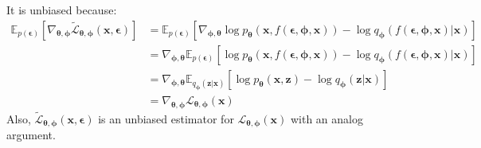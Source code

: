 \documentclass[12pt]{report}
\theoremstyle{definition}
\begin{document}
It is unbiased because:
\begin{equation}
\begin{split}
\mathbb{E}_{p(\pmb{\epsilon})}\left[ \nabla_{\pmb{\theta}, \pmb{\phi}}\tilde{\mathcal{L}}_{\pmb{\theta}, \pmb{\phi}}(\mathbf{x}, \pmb{\epsilon}) \right] 
& = \mathbb{E}_{p(\pmb{\epsilon})}\left[ \nabla_{\pmb{\phi}, \pmb{\theta}} \log p_{\mathbf{\theta}}(\mathbf{x}, f(\pmb{\epsilon}, \pmb{\phi}, \mathbf{x})) - \log q_{\mathbf{\phi}}(f(\pmb{\epsilon}, \pmb{\phi}, \mathbf{x})|\mathbf{x}) \right] \\
& = \nabla_{\pmb{\phi}, \pmb{\theta}} \mathbb{E}_{p(\pmb{\epsilon})}\left[  \log p_{\mathbf{\theta}}(\mathbf{x}, f(\pmb{\epsilon}, \pmb{\phi}, \mathbf{x})) - \log q_{\mathbf{\phi}}(f(\pmb{\epsilon}, \pmb{\phi}, \mathbf{x})|\mathbf{x}) \right] \\
& = \nabla_{\pmb{\phi}, \pmb{\theta}} \mathbb{E}_{q_{\mathbf{\phi}}(\mathbf{z}|\mathbf{x})}\left[  \log p_{\mathbf{\theta}}(\mathbf{x}, \mathbf{z}) - \log q_{\mathbf{\phi}}(\mathbf{z}|\mathbf{x}) \right] \\
& = \nabla_{\pmb{\theta}, \pmb{\phi}}\mathcal{L}_{\pmb{\theta}, \pmb{\phi}}(\mathbf{x}) 
\end{split}
\end{equation}
Also, $\tilde{\mathcal{L}}_{\pmb{\theta}, \pmb{\phi}}(\mathbf{x}, \pmb{\epsilon})$ is an unbiased estimator for $\mathcal{L}_{\pmb{\theta}, \pmb{\phi}}(\mathbf{x})$ with an analog argument.
\end{document}
